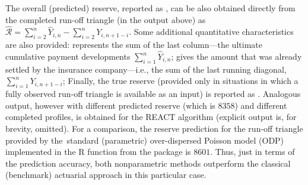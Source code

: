 The overall (predicted) reserve, reported as  , can be also obtained directly from the completed run-off triangle (in the output above) as $\widehat{\mathcal{R}} = \sum_{i = 2}^n \widehat{Y}_{i,n} - \sum_{i = 2}^n Y_{i, n + 1 - i}$. Some additional quantitative characteristics are also provided:  represents the sum of the last column---the ultimate cumulative payment developments $\sum_{i = 1}^{n} \widehat{Y}_{i, n}$;  gives the amount that was already settled by the insurance company---i.e., the sum of the last running diagonal, $\sum_{i = 1}^{n} Y_{i, n + 1 - i}$; Finally, the true reserve (provided only in situations in which a fully observed run-off triangle is available as an input) is reported as . 
Analogous output, however with different predicted reserve (which is $8358$) and different completed profiles, is obtained for the REACT algorithm (explicit output is, for brevity, omitted). 
For a comparison, the reserve prediction for the  run-off triangle provided by the~standard (parametric) over-dispersed Poisson model (ODP) implemented in the R function  from the package  is $8601$. Thus, just in terms of the prediction accuracy, both nonparametric methods outperform the classical (benchmark) actuarial approach in this particular case.  

